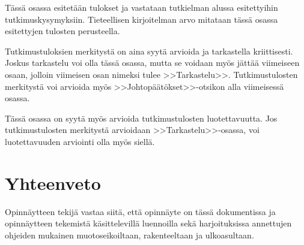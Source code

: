 \documentclass[finnish,12pt,a4paper,pdftex]{article}
\begin{document}
Tässä osassa esitetään tulokset ja vastataan tutkielman alussa
esitettyihin tutkimuskysymyksiin. Tieteellisen kirjoitelman
arvo mitataan tässä osassa esitettyjen tulosten perusteella. 

Tutkimustuloksien merkitystä on aina syytä arvioida ja tarkastella
kriittisesti.  Joskus tarkastelu voi olla tässä osassa, mutta se
voidaan myös jättää viimeiseen osaan, jolloin viimeisen osan nimeksi
tulee >>Tarkastelu>>. Tutkimustulosten merkitystä voi arvioida myös
>>Johtopäätökset>>-otsikon alla viimeisessä osassa. 

Tässä osassa on syytä myös arvioida tutkimustulosten luotettavuutta.
Jos tutkimustulosten merkitystä arvioidaan >>Tarkastelu>>-osassa,
voi luotettavuuden arviointi olla myös siellä. 

\clearpage

\section{Yhteenveto}

Opinnäytteen tekijä vastaa siitä, että opinnäyte on tässä dokumentissa
ja opinnäytteen tekemistä käsittelevillä luennoilla sekä
harjoituksissa annettujen ohjeiden mukainen muotoseikoiltaan,
rakenteeltaan ja ulkoasultaan.



\clearpage





\appendix 
\clearpage
\end{document}
